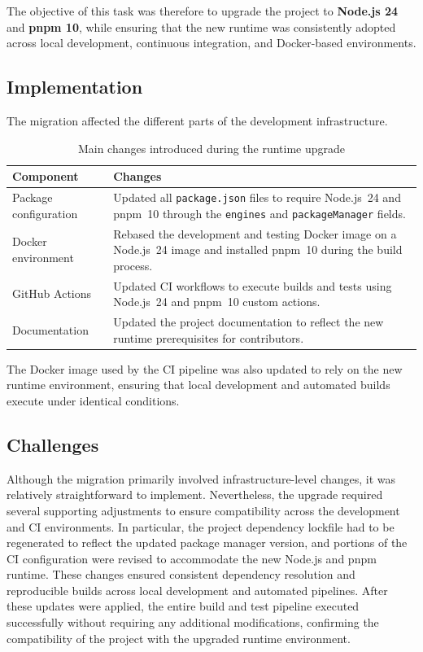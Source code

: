 The objective of this task was therefore to upgrade the project to \textbf{Node.js 24} and \textbf{pnpm 10}, while ensuring that the new runtime was consistently adopted across local development, continuous integration, and Docker-based environments.

\subsection{Implementation}

The migration affected the different parts of the development infrastructure.
\begin{table}[H]
\centering

\begin{tabular}{|p{4cm}|p{11cm}|}
\hline
\textbf{Component} & \textbf{Changes} \\
\hline

Package configuration &
Updated all \texttt{package.json} files to require Node.js~24 and pnpm~10 through the \texttt{engines} and \texttt{packageManager} fields. \\
\hline

Docker environment &
Rebased the development and testing Docker image on a Node.js~24 image and installed pnpm~10 during the build process. \\
\hline

GitHub Actions &
Updated CI workflows to execute builds and tests using Node.js~24 and pnpm~10 custom actions.\\
\hline

Documentation &
Updated the project documentation to reflect the new runtime prerequisites for contributors. \\
\hline

\end{tabular}
\caption{Main changes introduced during the runtime upgrade}
\label{tab:runtime-upgrade}
\end{table}

The Docker image used by the CI pipeline was also updated to rely on the new runtime environment, ensuring that local development and automated builds execute under identical conditions.

\subsection{Challenges}

Although the migration primarily involved infrastructure-level changes, it was relatively straightforward to implement. Nevertheless, the upgrade required several supporting adjustments to ensure compatibility across the development and CI environments. In particular, the project dependency lockfile had to be regenerated to reflect the updated package manager version, and portions of the CI configuration were revised to accommodate the new Node.js and pnpm runtime. These changes ensured consistent dependency resolution and reproducible builds across local development and automated pipelines. After these updates were applied, the entire build and test pipeline executed successfully without requiring any additional modifications, confirming the compatibility of the project with the upgraded runtime environment.

